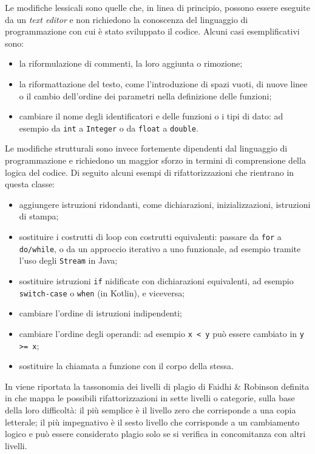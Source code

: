 Le modifiche lessicali sono quelle che, in linea di principio, possono essere eseguite da un \textit{text editor} e non richiedono la conoscenza del linguaggio di programmazione con cui è stato sviluppato il codice.
%
Alcuni casi esemplificativi sono:
\begin{itemize}
    \item la riformulazione di commenti, la loro aggiunta o rimozione;
    \item la riformattazione del testo, come l'introduzione di spazi vuoti, di nuove linee o il cambio dell'ordine dei parametri nella definizione delle funzioni;
    \item cambiare il nome degli identificatori e delle funzioni o i tipi di dato: ad esempio da \texttt{int} a \texttt{Integer} o da \texttt{float} a \texttt{double}.
\end{itemize}

Le modifiche strutturali sono invece fortemente dipendenti dal linguaggio di programmazione e richiedono un maggior sforzo in termini di comprensione della logica del codice.
%
Di seguito alcuni esempi di rifattorizzazioni che rientrano in questa classe:
\begin{itemize}
    \item aggiungere istruzioni ridondanti, come dichiarazioni, inizializzazioni, istruzioni di stampa;
    \item sostituire i costrutti di loop con costrutti equivalenti: passare da \texttt{for} a \texttt{do/while}, o da un approccio iterativo a uno funzionale, ad esempio tramite l'uso degli \texttt{Stream} in Java;
    \item sostituire istruzioni \texttt{if} nidificate con dichiarazioni equivalenti, ad esempio \texttt{switch-case} o \texttt{when} (in Kotlin), e viceversa;
    \item cambiare l'ordine di istruzioni indipendenti;
    \item cambiare l'ordine degli operandi: ad esempio \texttt{x < y} può essere cambiato in \texttt{y >= x};
    \item sostituire la chiamata a funzione con il corpo della stessa.
\end{itemize}

In  viene riportata la tassonomia dei livelli di plagio di Faidhi \& Robinson definita in \cite{faidhi-robinson-1987} che mappa le possibili rifattorizzazioni in sette livelli o categorie, sulla base della loro difficoltà: il più semplice è il livello zero che corrisponde a una copia letterale; il più impegnativo è il sesto livello che corrisponde a un cambiamento logico e può essere considerato plagio solo se si verifica in concomitanza con altri livelli.

